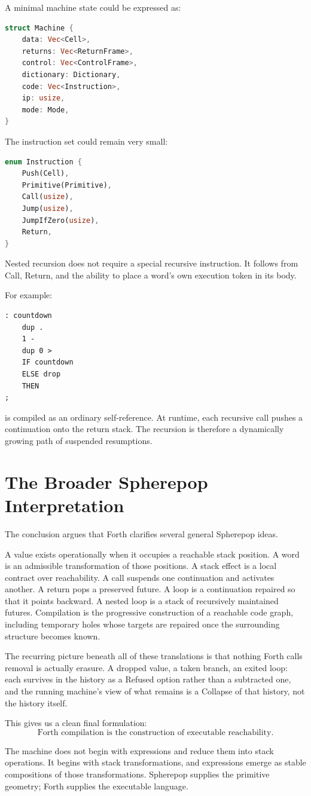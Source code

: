 \documentclass[12pt]{article}
\begin{document}
A minimal machine state could be expressed as:

\begin{lstlisting}[language=Rust]
struct Machine {
    data: Vec<Cell>,
    returns: Vec<ReturnFrame>,
    control: Vec<ControlFrame>,
    dictionary: Dictionary,
    code: Vec<Instruction>,
    ip: usize,
    mode: Mode,
}
\end{lstlisting}

The instruction set could remain very small:

\begin{lstlisting}[language=Rust]
enum Instruction {
    Push(Cell),
    Primitive(Primitive),
    Call(usize),
    Jump(usize),
    JumpIfZero(usize),
    Return,
}
\end{lstlisting}

Nested recursion does not require a special recursive instruction. It follows from Call, Return, and the ability to place a word's own execution token in its body.

For example:
\begin{lstlisting}
: countdown
    dup .
    1 -
    dup 0 >
    IF countdown
    ELSE drop
    THEN
;
\end{lstlisting}
is compiled as an ordinary self-reference. At runtime, each recursive call pushes a continuation onto the return stack. The recursion is therefore a dynamically growing path of suspended resumptions.

\section{The Broader Spherepop Interpretation}

The conclusion argues that Forth clarifies several general Spherepop ideas.

A value exists operationally when it occupies a reachable stack position. A word is an admissible transformation of those positions. A stack effect is a local contract over reachability. A call suspends one continuation and activates another. A return pops a preserved future. A loop is a continuation repaired so that it points backward. A nested loop is a stack of recursively maintained futures. Compilation is the progressive construction of a reachable code graph, including temporary holes whose targets are repaired once the surrounding structure becomes known.

The recurring picture beneath all of these translations is that nothing Forth calls removal is actually erasure. A dropped value, a taken branch, an exited loop: each survives in the history as a Refused option rather than a subtracted one, and the running machine's view of what remains is a Collapse of that history, not the history itself.

This gives us a clean final formulation:
\[
\boxed{\text{Forth compilation is the construction of executable reachability.}}
\]

The machine does not begin with expressions and reduce them into stack operations. It begins with stack transformations, and expressions emerge as stable compositions of those transformations. Spherepop supplies the primitive geometry; Forth supplies the executable language.
\end{document}
